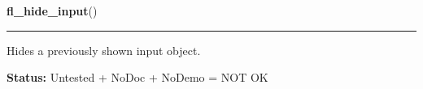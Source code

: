     \vspace{0.5ex}

\hspace{.8\funcindent}\begin{boxedminipage}{\funcwidth}

    \raggedright \textbf{fl\_hide\_input}()

    \vspace{-1.5ex}

    \rule{\textwidth}{0.5\fboxrule}
\setlength{\parskip}{2ex}
    Hides a previously shown input object.

\setlength{\parskip}{1ex}
\textbf{Status:} Untested + NoDoc + NoDemo = NOT OK



    \end{boxedminipage}

    \label{xformslib:flgoodies:fl_show_simple_input}

    \vspace{0.5ex}

